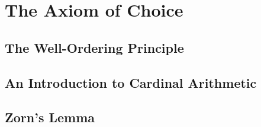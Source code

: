 \section{The Axiom of Choice}


\subsection{The Well-Ordering Principle}

\subsection{An Introduction to Cardinal Arithmetic}

\subsection{Zorn's Lemma}